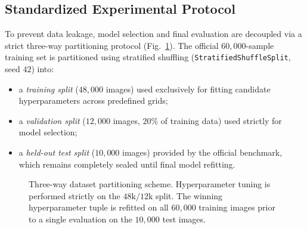 \documentclass[conference]{IEEEtran}
\newcommand{\code}[1]{\texttt{#1}}
\begin{document}
\subsection{Standardized Experimental Protocol}
\label{sec:protocol}
To prevent data leakage, model selection and final evaluation are decoupled
via a strict three-way partitioning protocol (Fig.~\ref{fig:splits}).
The official $60{,}000$-sample training set is partitioned using stratified
shuffling (\code{StratifiedShuffleSplit}, seed $42$) into:
\begin{itemize}
  \item a \emph{training split} ($48{,}000$ images) used exclusively for
    fitting candidate hyperparameters across predefined grids;
  \item a \emph{validation split} ($12{,}000$ images, $20\%$ of training data)
    used strictly for model selection;
  \item a \emph{held-out test split} ($10{,}000$ images) provided by the
    official benchmark, which remains completely sealed until final model
    refitting.
\end{itemize}

\begin{figure}[!t]
\centering
{}
\caption{Three-way dataset partitioning scheme. Hyperparameter tuning is
performed strictly on the $48\text{k}/12\text{k}$ split. The winning
hyperparameter tuple is refitted on all $60{,}000$ training images prior to
a single evaluation on the $10{,}000$ test images.}
\label{fig:splits}
\end{figure}
\end{document}
